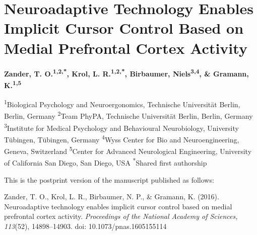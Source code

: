 
\chapter{Neuroadaptive Technology Enables Implicit Cursor Control Based on Medial Prefrontal Cortex Activity}
%
\label{chapter:nat}%


{\chaptermeta

\textbf{Zander, T. O.\textsuperscript{1,2,*}, Krol, L. R.\textsuperscript{1,2,*}, Birbaumer, Niels\textsuperscript{3,4}, \& Gramann, K.\textsuperscript{1,5}}

{\small
\textsuperscript{1}Biological Psychology and Neuroergonomics, Technische Universität Berlin, Berlin, Germany
\textsuperscript{2}Team PhyPA, Technische Universität Berlin, Berlin, Germany
\textsuperscript{3}Institute for Medical Psychology and Behavioural Neurobiology, University Tübingen, Tübingen, Germany
\textsuperscript{4}Wyss Center for Bio and Neuroengineering, Geneva, Switzerland
\textsuperscript{5}Center for Advanced Neurological Engineering,
University of California San Diego, San Diego, USA \textsuperscript{*}Shared first authorship

This is the postprint version of the manuscript published as follows:

Zander, T. O., Krol, L. R., Birbaumer, N. P., \& Gramann, K. (2016). Neuroadaptive technology enables implicit cursor control based on medial prefrontal cortex activity. \emph{Proceedings of the National Academy of Sciences, 113}(52), 14898–14903. doi: 10.1073/pnas.1605155114\nocite{zander2016nat}
\par}}



